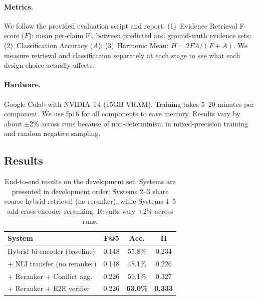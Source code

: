 \documentclass[11pt]{article}
\begin{document}
\paragraph{Metrics.}
We follow the provided evaluation script and report:
(1)~Evidence Retrieval F-score ($F$): mean per-claim F1 between
predicted and ground-truth evidence sets;
(2)~Classification Accuracy ($A$);
(3)~Harmonic Mean: $H = 2FA/(F+A)$.
We measure retrieval and classification separately at each stage to
see what each design choice actually affects.

\paragraph{Hardware.}
Google Colab with NVIDIA T4 (15GB VRAM).
Training takes 5--20 minutes per component.
We use fp16 for all components to save memory.
Results vary by about $\pm$2\% across runs because of non-determinism
in mixed-precision training and random negative sampling.

\subsection{Results}

\begin{table}[t]
\centering
\small
\begin{tabular}{@{}lccc@{}}
\toprule
\textbf{System} & \textbf{F@5} & \textbf{Acc.} & \textbf{H} \\
\midrule
Hybrid bi-encoder (baseline) & 0.148 & 55.8\% & 0.234 \\
+ NLI transfer (no reranker) & 0.148 & 48.1\% & 0.226 \\
+ Reranker + Conflict agg. & 0.226 & 59.1\% & 0.327 \\
+ Reranker + E2E verifier & 0.226 & \textbf{63.0\%} & \textbf{0.333} \\
\bottomrule
\end{tabular}
\caption{End-to-end results on the development set. Systems are
presented in development order: Systems 2--3 share coarse hybrid
retrieval (no reranker), while Systems 4--5 add cross-encoder
reranking. Results vary $\pm$2\% across runs.}
\label{tab:main-results}
\end{table}
\end{document}
